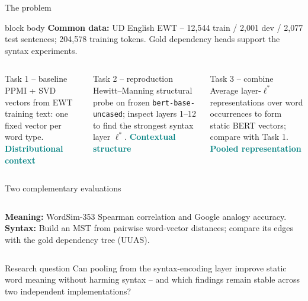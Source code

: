 \documentclass[aspectratio=169,9pt,t]{beamer}
\newcommand{\lstar}{\ensuremath{\ell^*}}
\begin{document}
\begin{frame}{The problem}
\begin{beamercolorbox}[rounded=true,sep=0.15ex,wd=\linewidth]{block body}
\scriptsize\textbf{Common data:} UD English EWT -- 12,544 train / 2,001 dev / 2,077 test sentences; 204,578 training tokens. Gold dependency heads support the syntax experiments.
\end{beamercolorbox}
\vspace{0.04em}
\begin{columns}[T,onlytextwidth]
  \begin{block}{Task 1 -- baseline}
    \small PPMI + SVD vectors from EWT training text: one fixed vector per word type.
    \vspace{0.25em}
    \centering\textcolor{Teal}{\bfseries Distributional context}
  \end{block}
  \begin{block}{Task 2 -- reproduction}
    \small Hewitt--Manning structural probe on frozen \texttt{bert-base-uncased}; inspect layers 1--12 to find the strongest syntax layer \lstar.
    \vspace{0.25em}
    \centering\textcolor{Teal}{\bfseries Contextual structure}
  \end{block}
  \begin{block}{Task 3 -- combine}
    \small Average layer-\lstar{} representations over word occurrences to form static BERT vectors; compare with Task 1.
    \vspace{0.25em}
    \centering\textcolor{Teal}{\bfseries Pooled representation}
  \end{block}
\end{columns}
\vspace{0.25em}
\begin{exampleblock}{Two complementary evaluations}
\begin{columns}[T,onlytextwidth]
\textbf{Meaning:} WordSim-353 Spearman correlation and Google analogy accuracy.
\textbf{Syntax:} Build an MST from pairwise word-vector distances; compare its edges with the gold dependency tree (UUAS).
\end{columns}
\end{exampleblock}
\vspace{0.15em}
\begin{alertblock}{Research question}
Can pooling from the syntax-encoding layer improve static word meaning without harming syntax -- and which findings remain stable across two independent implementations?
\end{alertblock}
\end{frame}
\end{document}
